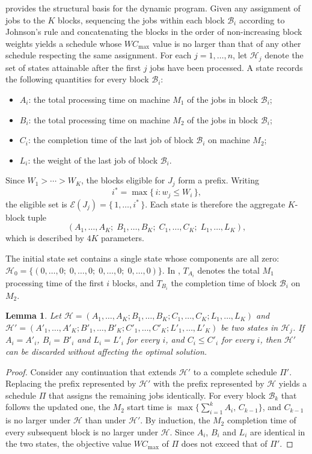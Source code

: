 \documentclass[12pt]{article}
\newtheorem{lemma}{Lemma}[section]
\begin{document}
\begin{sloppypar}
 provides the structural basis for the dynamic program. Given any
assignment of jobs to the $K$ blocks, sequencing the jobs within each block $\mathcal{B}_i$
according to Johnson's rule and concatenating the blocks in the order of non-increasing block
weights yields a schedule whose $W C_{\max}$ value is no larger than that of any other schedule
respecting the same assignment.
For each $j = 1,\dots,n$, let $\mathscr{H}_j$ denote the set of states attainable after the first
$j$ jobs have been processed. A state records the following quantities for every block
$\mathcal{B}_i$:
\begin{itemize}
    \item $A_i$: the total processing time on machine $M_1$ of the jobs in block $\mathcal{B}_i$;
    \item $B_i$: the total processing time on machine $M_2$ of the jobs in block $\mathcal{B}_i$;
    \item $C_i$: the completion time of the last job of block $\mathcal{B}_i$ on machine $M_2$;
    \item $L_i$: the weight of the last job of block $\mathcal{B}_i$.
\end{itemize}
Since $W_1 > \cdots > W_K$, the blocks eligible for $J_j$ form a prefix. Writing
\[
    i^* = \max\{\, i : w_j \le W_i \,\},
\]
the eligible set is $\mathcal{E}(J_j) = \{\, 1,\dots,i^* \,\}$.
Each state is therefore the aggregate $K$-block tuple
\[
    (A_1,\dots,A_K; \; B_1,\dots,B_K; \; C_1,\dots,C_K; \; L_1,\dots,L_K),
\]
which is described by $4K$ parameters.

The initial state set contains a single state whose components are all zero:
$\mathscr{H}_{0} = \{ (0,\dots,0; \; 0,\dots,0; \; 0,\dots,0; \; 0,\dots,0) \}$.
In , $T_{A_i}$ denotes the total $M_1$ processing time of the first
$i$ blocks, and $T_{B_i}$ the completion time of block $\mathcal{B}_i$ on $M_2$.

\begin{lemma}\label{lem:merge-dominance}
Let $\mathscr{H} = (A_1,\dots,A_K; B_1,\dots,B_K; C_1,\dots,C_K; L_1,\dots,L_K)$ and
$\mathscr{H}' = (A'_1,\dots,A'_K; B'_1,\dots,B'_K; C'_1,\dots,C'_K; L'_1,\dots,L'_K)$ be two states
in $\mathscr{H}_j$. If $A_i = A'_i$, $B_i = B'_i$ and $L_i = L'_i$ for every $i$, and
$C_i \le C'_i$ for every $i$, then $\mathscr{H}'$ can be discarded without affecting the optimal
solution.
\end{lemma}
\begin{proof}
Consider any continuation that extends $\mathscr{H}'$ to a complete schedule $\Pi'$. Replacing the
prefix represented by $\mathscr{H}'$ with the prefix represented by $\mathscr{H}$ yields a schedule
$\Pi$ that assigns the remaining jobs identically. For every block $\mathcal{B}_k$ that follows the
updated one, the $M_2$ start time is $\max\{\sum_{i=1}^{k}A_{i},\, C_{k-1}\}$, and $C_{k-1}$ is no
larger under $\mathscr{H}$ than under $\mathscr{H}'$. By induction, the $M_2$ completion time of
every subsequent block is no larger under $\mathscr{H}$. Since $A_i$, $B_i$ and $L_i$ are identical
in the two states, the objective value $W C_{\max}$ of $\Pi$ does not exceed that of $\Pi'$.
\end{proof}


\end{sloppypar}
\end{document}
